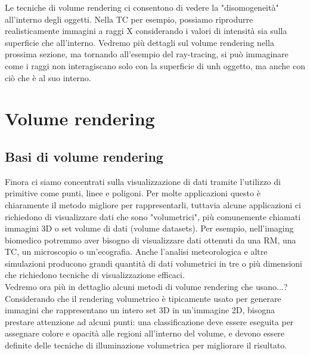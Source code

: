 Le tecniche di volume rendering ci consentono di vedere la "disomogeneità" all'interno degli oggetti. Nella TC per esempio, possiamo riprodurre realisticamente immagini a raggi X considerando i valori di intensità sia sulla superficie che all'interno. Vedremo più dettagli sul volume rendering nella prossima sezione, ma tornando all'esempio del ray-tracing, si può immaginare come i raggi non interagiscano solo con la superficie di unh oggetto, ma anche con ciò che è al suo interno.

\section{Volume rendering}
\subsection{Basi di volume rendering}\label{sec:volume-rendering-details}
Finora ci siamo concentrati sulla visualizzazione di dati tramite l'utilizzo di primitive come punti, linee e poligoni. Per molte applicazioni questo è chiaramente il metodo migliore per rappresentarli, tuttavia alcune applicazioni ci richiedono di visualizzare dati che sono "volumetrici", più comunemente chiamati immagini 3D o set volume di dati (volume datasets). Per esempio, nell'imaging biomedico potremmo aver bisogno di visualizzare dati ottenuti da una RM, una TC, un microscopio o un'ecografia. Anche l'analisi meteorologica e altre simulazioni producono grandi quantità di dati volumetrici in tre o più dimensioni che richiedono tecniche di visualizzazione efficaci.
\\
Vedremo ora più in dettaglio alcuni metodi di volume rendering che usano...?
\\
Considerando che il rendering volumetrico è tipicamente usato per generare immagini che rappresentano un intero set 3D in un'immagine 2D, bisogna prestare attenzione ad alcuni punti: una classificazione deve essere eseguita per assegnare colore e opacità alle regioni all'interno del volume, e devono essere definite delle tecniche di illuminazione volumetrica per migliorare il risultato.

